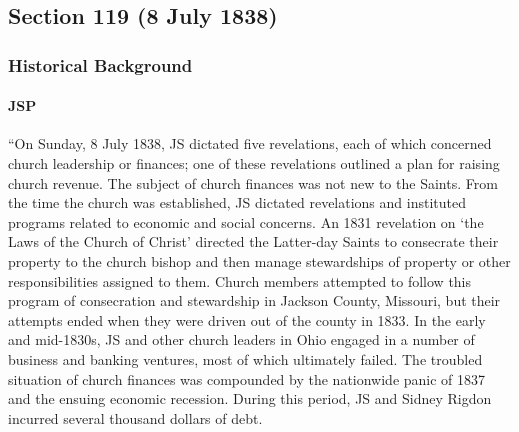 \subsection{Section 119 (8 July 1838)}
	\label{DC119}
	
	\subsubsection{Historical Background}
		\label{DC119-HB}
		
		\paragraph{JSP}
		
			``On Sunday, 8 July 1838, JS dictated five revelations, each of which concerned church leadership or finances; one of these revelations outlined a plan for raising church revenue. The subject of church finances was not new to the Saints. From the time the church was established, JS dictated revelations and instituted programs related to economic and social concerns. An 1831 revelation on `the Laws of the Church of Christ' directed the Latter-day Saints to consecrate their property to the church bishop and then manage stewardships of property or other responsibilities assigned to them. Church members attempted to follow this program of consecration and stewardship in Jackson County, Missouri, but their attempts ended when they were driven out of the county in 1833. In the early and mid-1830s, JS and other church leaders in Ohio engaged in a number of business and banking ventures, most of which ultimately failed. The troubled situation of church finances was compounded by the nationwide panic of 1837 and the ensuing economic recession. During this period, JS and Sidney Rigdon incurred several thousand dollars of debt.
			
